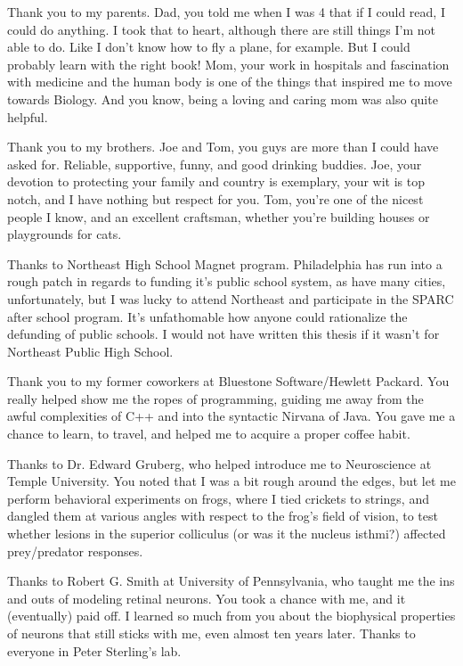 \documentclass{ucbthesis}
\begin{document}
\begin{frontmatter}

\begin{acknowledgements}

Thank you to my parents. Dad, you told me when I was 4 that if I could read, I could do anything. I took that to heart, although there are still things I'm not able to do. Like I don't know how to fly a plane, for example. But I could probably learn with the right book! Mom, your work in hospitals and fascination with medicine and the human body is one of the things that inspired me to move towards Biology. And you know, being a loving and caring mom was also quite helpful.

Thank you to my brothers. Joe and Tom, you guys are more than I could have asked for. Reliable, supportive, funny, and good drinking buddies. Joe, your devotion to protecting your family and country is exemplary, your wit is top notch, and I have nothing but respect for you. Tom, you're one of the nicest people I know, and an excellent craftsman, whether you're building houses or playgrounds for cats.

Thanks to Northeast High School Magnet program. Philadelphia has run into a rough patch in regards to funding it's public school system, as have many cities, unfortunately, but I was lucky to attend Northeast and participate in the SPARC after school program. It's unfathomable how anyone could rationalize the defunding of public schools. I would not have written this thesis if it wasn't for Northeast Public High School.

Thank you to my former coworkers at Bluestone Software/Hewlett Packard. You really helped show me the ropes of programming, guiding me away from the awful complexities of C++ and into the syntactic Nirvana of Java. You gave me a chance to learn, to travel, and helped me to acquire a proper coffee habit.

Thanks to Dr. Edward Gruberg, who helped introduce me to Neuroscience at Temple University. You noted that I was a bit rough around the edges, but let me perform behavioral experiments on frogs, where I tied crickets to strings, and dangled them at various angles with respect to the frog's field of vision, to test whether lesions in the superior colliculus (or was it the nucleus isthmi?) affected prey/predator responses.

Thanks to Robert G. Smith at University of Pennsylvania, who taught me the ins and outs of modeling retinal neurons. You took a chance with me, and it (eventually) paid off. I learned so much from you about the biophysical properties of neurons that still sticks with me, even almost ten years later. Thanks to everyone in Peter Sterling's lab.


\end{acknowledgements}
\end{frontmatter}
\end{document}
